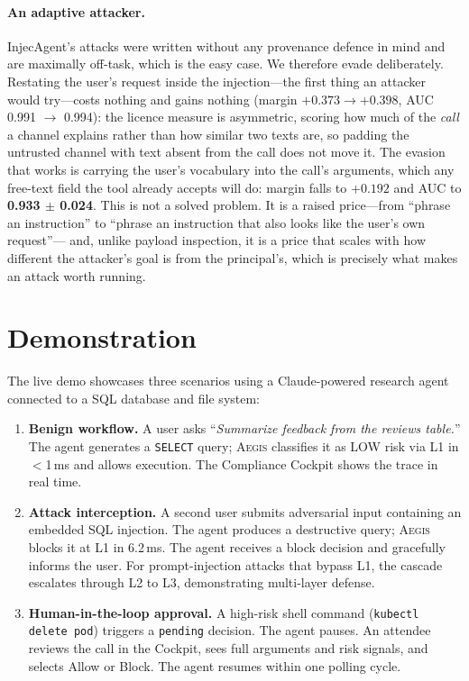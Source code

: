 \documentclass[11pt]{article}
\newcommand{\system}{\textsc{Aegis}\xspace}
\begin{document}
\paragraph{An adaptive attacker.}
InjecAgent's attacks were written without any provenance defence in mind
and are maximally off-task, which is the easy case. We therefore evade
deliberately. Restating the user's request inside the injection---the
first thing an attacker would try---costs nothing and gains nothing
(margin $+0.373 \to +0.398$, AUC 0.991 $\to$ 0.994): the licence measure
is asymmetric, scoring how much of the \emph{call} a channel explains
rather than how similar two texts are, so padding the untrusted channel
with text absent from the call does not move it. The evasion that works
is carrying the user's vocabulary into the call's arguments, which any
free-text field the tool already accepts will do: margin falls to
$+0.192$ and AUC to \textbf{0.933 $\pm$ 0.024}. This is not a solved
problem. It is a raised price---from ``phrase an instruction'' to
``phrase an instruction that also looks like the user's own request''---
and, unlike payload inspection, it is a price that scales with how
different the attacker's goal is from the principal's, which is precisely
what makes an attack worth running.

\section{Demonstration}
\label{sec:demo}

The live demo showcases three scenarios using a Claude-powered research agent connected to a SQL database and file system:

\begin{enumerate}[nosep,leftmargin=*]
\item \textbf{Benign workflow.}
A user asks ``\emph{Summarize feedback from the reviews table.}''
The agent generates a \texttt{SELECT} query; \system classifies it as LOW risk via L1 in $<$1\,ms and allows execution.
The Compliance Cockpit shows the trace in real time.

\item \textbf{Attack interception.}
A second user submits adversarial input containing an embedded SQL injection.
The agent produces a destructive query; \system blocks it at L1 in 6.2\,ms.
The agent receives a block decision and gracefully informs the user.
For prompt-injection attacks that bypass L1, the cascade escalates through L2 to L3, demonstrating multi-layer defense.

\item \textbf{Human-in-the-loop approval.}
A high-risk shell command (\texttt{kubectl delete pod}) triggers a \texttt{pending} decision.
The agent pauses. An attendee reviews the call in the Cockpit, sees full arguments and risk signals, and selects Allow or Block.
The agent resumes within one polling cycle.
\end{enumerate}
\end{document}
